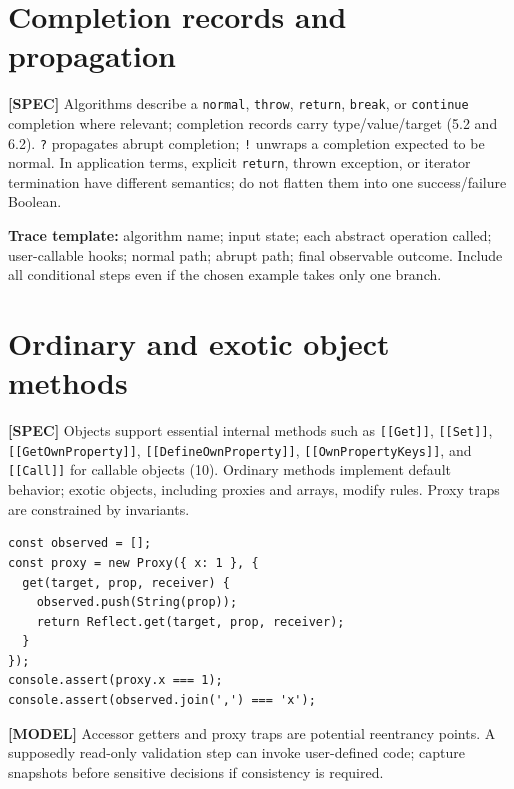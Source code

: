 \documentclass[11pt,letterpaper]{article}
\newcommand{\passthrough}[1]{#1}
\begin{document}
\section{Completion records and propagation}\label{completion-records-and-propagation}

\textbf{{[}SPEC{]}} Algorithms describe a \passthrough{\lstinline!normal!}, \passthrough{\lstinline!throw!}, \passthrough{\lstinline!return!}, \passthrough{\lstinline!break!}, or \passthrough{\lstinline!continue!} completion where relevant; completion records carry type/value/target (5.2 and 6.2). \passthrough{\lstinline!?!} propagates abrupt completion; \passthrough{\lstinline"!"} unwraps a completion expected to be normal. In application terms, explicit \passthrough{\lstinline!return!}, thrown exception, or iterator termination have different semantics; do not flatten them into one success/failure Boolean.

\textbf{Trace template:} algorithm name; input state; each abstract operation called; user-callable hooks; normal path; abrupt path; final observable outcome. Include all conditional steps even if the chosen example takes only one branch.

\section{Ordinary and exotic object methods}\label{ordinary-and-exotic-object-methods}

\textbf{{[}SPEC{]}} Objects support essential internal methods such as \passthrough{\lstinline![[Get]]!}, \passthrough{\lstinline![[Set]]!}, \passthrough{\lstinline![[GetOwnProperty]]!}, \passthrough{\lstinline![[DefineOwnProperty]]!}, \passthrough{\lstinline![[OwnPropertyKeys]]!}, and \passthrough{\lstinline![[Call]]!} for callable objects (10). Ordinary methods implement default behavior; exotic objects, including proxies and arrays, modify rules. Proxy traps are constrained by invariants.

\begin{lstlisting}
const observed = [];
const proxy = new Proxy({ x: 1 }, {
  get(target, prop, receiver) {
    observed.push(String(prop));
    return Reflect.get(target, prop, receiver);
  }
});
console.assert(proxy.x === 1);
console.assert(observed.join(',') === 'x');
\end{lstlisting}

\textbf{{[}MODEL{]}} Accessor getters and proxy traps are potential reentrancy points. A supposedly read-only validation step can invoke user-defined code; capture snapshots before sensitive decisions if consistency is required.
\end{document}
